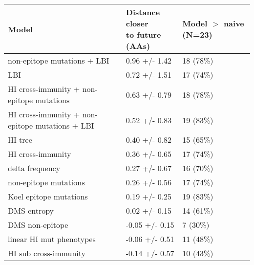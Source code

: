 \begin{tabular}{lll}
\toprule
                                           Model & \makecell{Distance closer \\ to future (AAs)} & \makecell{Model $>$ naive \\ (N=23)} \\
\midrule
                     non-epitope mutations + LBI &                                 0.96 +/- 1.42 &                            18 (78\%) \\
                                             LBI &                                 0.72 +/- 1.51 &                            17 (74\%) \\
       HI cross-immunity + non-epitope mutations &                                 0.63 +/- 0.79 &                            18 (78\%) \\
 HI cross-immunity + non-epitope mutations + LBI &                                 0.52 +/- 0.83 &                            19 (83\%) \\
                                         HI tree &                                 0.40 +/- 0.82 &                            15 (65\%) \\
                               HI cross-immunity &                                 0.36 +/- 0.65 &                            17 (74\%) \\
                                 delta frequency &                                 0.27 +/- 0.67 &                            16 (70\%) \\
                           non-epitope mutations &                                 0.26 +/- 0.56 &                            17 (74\%) \\
                          Koel epitope mutations &                                 0.19 +/- 0.25 &                            19 (83\%) \\
                                     DMS entropy &                                 0.02 +/- 0.15 &                            14 (61\%) \\
                                 DMS non-epitope &                                -0.05 +/- 0.15 &                             7 (30\%) \\
                        linear HI mut phenotypes &                                -0.06 +/- 0.51 &                            11 (48\%) \\
                           HI sub cross-immunity &                                -0.14 +/- 0.57 &                            10 (43\%) \\

\end{tabular}
